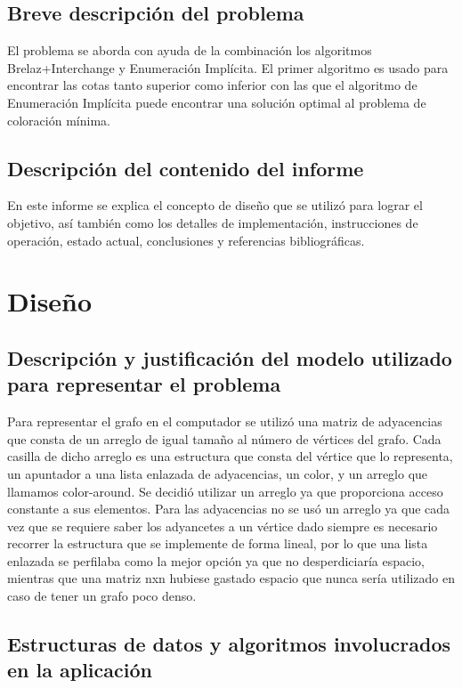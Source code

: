 \documentclass[a4paper,10pt]{article}
\begin{document}
\subsection{Breve descripción del problema}
El problema se aborda con ayuda de la combinación los algoritmos 
Brelaz+Interchange y Enumeración Implícita. El primer algoritmo es 
usado para encontrar las cotas tanto superior como inferior con las que 
el algoritmo de Enumeración Implícita puede encontrar una solución optimal
al problema de coloración mínima.

\subsection{Descripción del contenido del informe}
En este informe se explica el concepto de diseño que se utilizó
para lograr el objetivo, así también como los detalles de implementación, 
instrucciones de operación, estado actual, conclusiones y referencias bibliográficas.

\section{Diseño}

\subsection{Descripción y justificación del modelo utilizado para representar el problema}
Para representar el grafo en el computador se utilizó una matriz de adyacencias que consta 
de un arreglo de igual tamaño al número de vértices del grafo. Cada casilla de dicho arreglo es 
una estructura que consta del vértice que lo representa, un apuntador a una lista enlazada de adyacencias, 
un color, y un arreglo que llamamos color-around. Se decidió utilizar un arreglo ya que proporciona acceso 
constante a sus elementos. Para las adyacencias no se usó un arreglo ya que cada vez que se requiere saber los 
adyancetes a un vértice dado siempre es necesario recorrer la estructura que se implemente de forma lineal, por lo que 
una lista enlazada se perfilaba como la mejor opción ya que no desperdiciaría espacio, mientras que una matriz nxn 
hubiese gastado espacio que nunca sería utilizado en caso de tener un grafo poco denso.

\subsection{Estructuras de datos y algoritmos involucrados en la aplicación}
\end{document}
